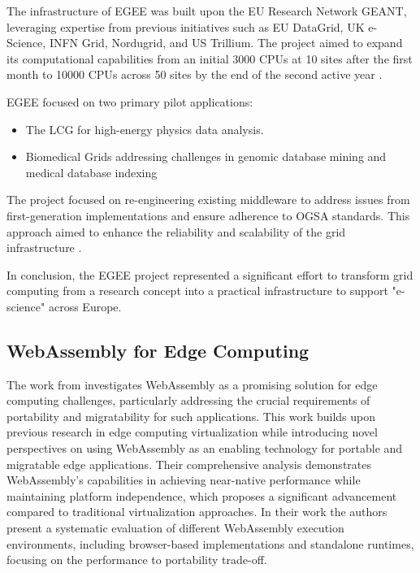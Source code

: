 The infrastructure of \ac{EGEE} was built upon the EU Research Network GEANT, leveraging expertise from previous initiatives such as EU DataGrid, UK e-Science, INFN Grid, Nordugrid, and US Trillium. The project aimed to expand its computational capabilities from an initial 3000 \acs{CPU}s at 10 sites after the first month to 10000 \acs{CPU}s across 50 sites by the end of the second active year \cite{relatedwork:egee}.

\ac{EGEE} focused on two primary pilot applications: 
\begin{itemize}
  \item The \ac{LCG} for high-energy physics data analysis.
  \item Biomedical Grids addressing challenges in genomic database mining and medical database indexing
\end{itemize}
The project focused on re-engineering existing middleware to address issues from first-generation implementations and ensure adherence to \ac{OGSA} standards. This approach aimed to enhance the reliability and scalability of the grid infrastructure \cite{relatedwork:egee}.

In conclusion, the \ac{EGEE} project represented a significant effort to transform grid computing from a research concept into a practical infrastructure to support "e-science" across Europe.

\subsection{WebAssembly for Edge Computing}
\label{subsec:background:related_work:wasmedgecomputing}
The work from \citeauthor{relatedwork:wasmedgecomputing} \cite{relatedwork:wasmedgecomputing} investigates WebAssembly as a promising solution for edge computing challenges, particularly addressing the crucial requirements of portability and migratability for such applications. This work builds upon previous research in edge computing virtualization while introducing novel perspectives on using WebAssembly as an enabling technology for portable and migratable edge applications. Their comprehensive analysis demonstrates WebAssembly's capabilities in achieving near-native performance while maintaining platform independence, which proposes a significant advancement compared to traditional virtualization approaches. In their work the authors present a systematic evaluation of different WebAssembly execution environments, including browser-based implementations and standalone runtimes, focusing on the performance to portability trade-off. 

